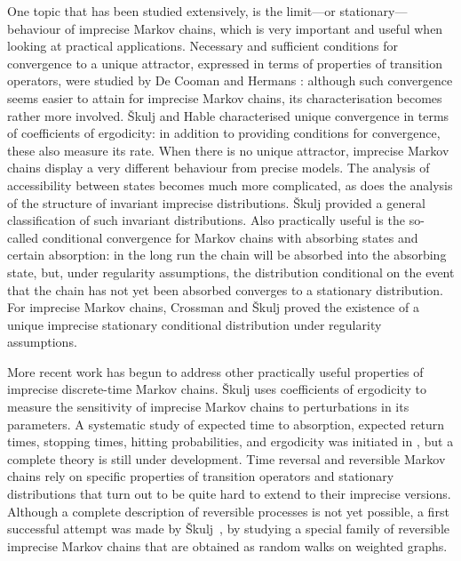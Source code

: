 \documentclass[11pt,dvipsnames,usenames,a4paper]{article}
\begin{document}
One topic that has been studied extensively, is the limit---or stationary---behaviour of imprecise Markov chains, which is very important and useful when looking at practical applications.
Necessary and sufficient conditions for convergence to a unique attractor, expressed in terms of properties of transition operators, were studied by De Cooman and Hermans \cite{cooman2008,hermans2012}: although such convergence seems easier to attain for imprecise Markov chains, its characterisation becomes rather more involved.
Škulj and Hable \cite{skulj2013} characterised unique convergence in terms of coefficients of ergodicity: in addition to providing conditions for convergence, these also measure its rate. 
When there is no unique attractor, imprecise Markov chains display a very different behaviour from precise models. 
The analysis of accessibility between states becomes much more complicated, as does the analysis of the structure of invariant imprecise distributions. 
Škulj \cite{skulj:13b} provided a general classification of such invariant distributions. Also practically useful is the so-called conditional convergence for Markov chains with absorbing states and certain absorption: in the long run the chain will be absorbed into the absorbing state, but, under regularity assumptions, the distribution conditional on the event that the chain has not yet been absorbed converges to a stationary distribution. 
For imprecise Markov chains, Crossman and Škulj \cite{Crossman:2010} proved the existence of a unique imprecise stationary conditional distribution under regularity assumptions. 

More recent work has begun to address other practically useful properties of imprecise discrete-time Markov chains.
Škulj \cite{skulj:2016b} uses coefficients of ergodicity to measure the sensitivity of imprecise Markov chains to perturbations in its parameters. 
A systematic study of expected time to absorption, expected return times, stopping times, hitting  probabilities, and ergodicity was initiated in \cite{troffaes:2013, cooman2015:markovergodic}, but a complete theory is still under development. 
Time reversal and reversible Markov chains rely on specific properties of transition operators and stationary distributions that turn out to be quite hard to extend to their imprecise versions. 
Although a complete description of reversible processes is not yet possible, a first successful attempt was made by Škulj~\cite{skulj:16}, by studying a special family of reversible imprecise Markov chains that are obtained as random walks on weighted graphs. 
\end{document}
